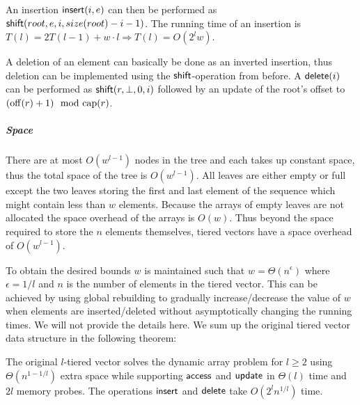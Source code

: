 An insertion $\mathsf{insert}(i, e)$ can then be performed as $\mathsf{shift}(root, e, i,
size(root) - i - 1)$. The running time of an insertion is $T(l) = 2T(l - 1) + w\cdot l \Rightarrow T(l) = O(2^l w)$.



A deletion of an element can basically be done as an inverted insertion, thus
deletion can be implemented using the $\mathsf{shift}$-operation from before. A
$\mathsf{delete}(i)$ can be performed as $\mathsf{shift}(r, \bot, 0, i)$ followed by an
update of the root's offset to $(\mathrm{off}(r) + 1) \mod {\mathrm{cap}}(r)$.

\subparagraph*{Space}

There are at most $O(w^{l-1})$ nodes in the tree and each takes up constant
space, thus the total space of the tree is $O(w^{l-1})$.
All leaves are either empty or full except the two leaves storing the first and
last element of the sequence which might contain less than $w$ elements.
Because the arrays of empty leaves are not allocated the space overhead of the arrays is $O(w)$.
Thus beyond the space required to store the $n$ elements themselves, tiered vectors
have a space overhead of $O(w^{l-1})$.

To obtain the desired bounds $w$ is maintained such that $w = \Theta(n^\epsilon)$ where $\epsilon = 1/l$ and $n$ is the number of elements in the tiered vector. This can be achieved by using global rebuilding to gradually increase/decrease the value of $w$ when elements are inserted/deleted without asymptotically changing the running times. We will not provide the details here. We sum up the original tiered vector data structure in the following theorem:

\begin{theorem} The original $l$-tiered vector solves the
    dynamic array problem for $l \geq 2$ using $\Theta(n^{1-1/l})$ extra space
    while supporting $\mathsf{access}$ and $\mathsf{update}$ in $\Theta(l)$ time and $2l$
    memory probes. The operations $\mathsf{insert}$ and $\mathsf{delete}$ take $O(2^l n^{1/l})$ time.
    \label{thm:pointer}
\end{theorem}
